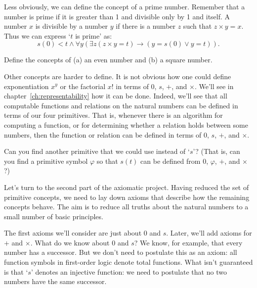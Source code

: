 Less obviously, we can define the concept of a prime number.
Remember that a number is prime if
it is greater than 1 and divisible only by 1 and itself.
A number $x$ is divisible by a number $y$
if there is a number $z$ such that $z \times y = x$.
Thus we can express `$t$ is prime' as:
\[
  s(0) < t \land \forall y(\exists z(z \times y = t) \to (y = s(0) \lor y = t)).
\]

\begin{exercise}
  Define the concepts of (a) an even number and (b) a square number.
\end{exercise}


Other concepts are harder to define.
It is not obvious how one could
define exponentiation $x^y$ or the factorial $x!$ in terms of 0, $s$, $+$, and $\times$.
We'll see in chapter~\ref{ch:representability} how it can be done.
Indeed,
we'll see that
all computable functions and relations on the natural numbers
can be defined in terms of our four primitives.
That is,
whenever there is an algorithm for computing a function,
or for determining whether a relation holds between some numbers,
then the function or relation can be defined in terms of 0, $s$, $+$, and $\times$.

\begin{exercise}
  Can you find another primitive that we could use instead of `$s$'?
  (That is, can you find a primitive symbol $\varphi$ so that
  $s(t)$ can be defined from 0, $\varphi$, $+$, and $\times$?)
\end{exercise}

Let's turn to the second part of the axiomatic project.
Having reduced the set of primitive concepts,
we need to lay down axioms
that describe how the remaining concepts behave.
The aim is to reduce all truths about the natural numbers
to a small number of basic principles.

The first axioms we'll consider are just about 0 and $s$.
Later,
we'll add axioms for $+$ and $\times$.
What do we know about 0 and $s$?
We know, for example,
that every number has a successor.
But we don't need to postulate this as an axiom:
all function symbols in first-order logic denote total functions.
What isn't guaranteed is that
`$s$' denotes an injective function:
we need to postulate that
no two numbers have the same successor.

